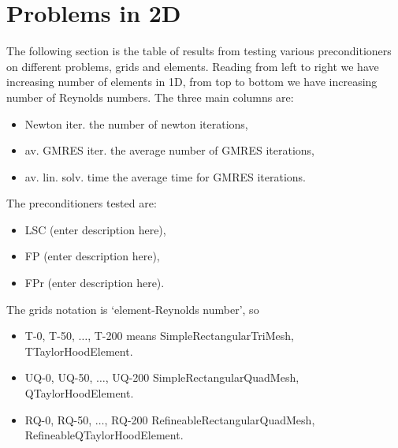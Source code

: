 \section{Problems in 2D}
The following section is the table of results from testing various preconditioners on different problems, grids and elements. Reading from left to right we have increasing number of elements in 1D, from top to bottom we have increasing number of Reynolds numbers. 
The three main columns are:
\begin{itemize}
  \item Newton iter. the number of newton iterations,
  \item av. GMRES iter. the average number of GMRES iterations,
  \item av. lin. solv. time the average time for GMRES iterations.
\end{itemize}
The preconditioners tested are:
\begin{itemize}
  \item LSC (enter description here),
  \item FP (enter description here),
  \item FPr (enter description here).
\end{itemize}
The grids notation is `element-Reynolds number', so 
\begin{itemize}
  \item T-0, T-50, $\ldots$, T-200 means SimpleRectangularTriMesh, TTaylorHoodElement.
  \item UQ-0, UQ-50, $\ldots$, UQ-200 SimpleRectangularQuadMesh, QTaylorHoodElement.
  \item RQ-0, RQ-50, $\ldots$, RQ-200  RefineableRectangularQuadMesh, RefineableQTaylorHoodElement.
\end{itemize}

